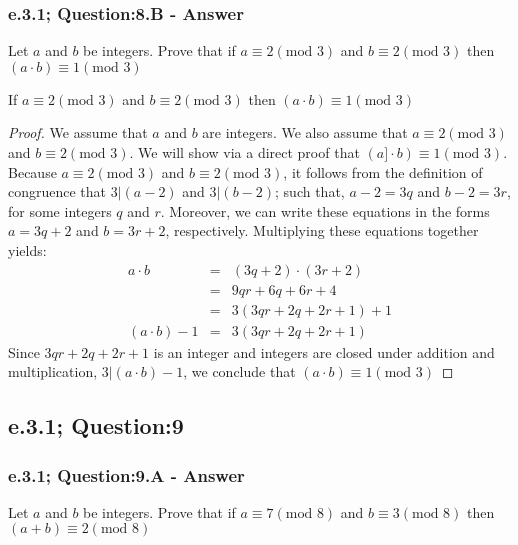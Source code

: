 \newpage
\subsubsection*{e.3.1; Question:8.B - Answer}
Let $a$ and $b$ be integers. Prove that if $a \equiv 2 (\text{mod 3})$ and $b \equiv 2 (\text{mod 3})$ then $(a\cdot b) \equiv 1 (\text{mod 3})$

\begin{tcolorbox}
	\begin{theorem}
		If $a \equiv 2 (\text{mod 3})$ and $b \equiv 2 (\text{mod 3})$ then $(a \cdot b) \equiv 1 (\text{mod 3})$
	\end{theorem}
\end{tcolorbox}

\begin{proof}
We assume that $a$ and $b$ are integers. We also assume that $a \equiv 2 (\text{mod 3})$ and $b \equiv 2 (\text{mod 3})$. We will show via a direct proof that $(a ]\cdot b) \equiv 1 (\text{mod 3})$. Because $a \equiv 2 (\text{mod 3})$ and $b \equiv 2 (\text{mod 3})$, it follows from the definition of congruence that $3|(a-2)$ and $3|(b-2)$; such that, $a-2 = 3q$ and $b-2 = 3r$, for some integers $q$ and $r$. Moreover, we can write these equations in the forms $a = 3q + 2$ and $b = 3r + 2$, respectively. Multiplying these equations together yields: 
	\begin{eqnarray}
		a \cdot b & = & (3q + 2) \cdot (3r + 2) \nonumber \\
		& = & 9qr + 6q + 6r + 4 \nonumber \\
		& = & 3(3qr + 2q + 2r + 1) + 1 \nonumber \\
		(a \cdot b) - 1 & = & 3(3qr + 2q + 2r + 1) \nonumber
	\end{eqnarray}
Since $3qr + 2q + 2r + 1$ is an integer and integers are closed under addition and multiplication, $3 | (a \cdot b) - 1$, we conclude that $(a \cdot b) \equiv 1 (\text{mod 3})$

\end{proof}






\newpage
\subsection{e.3.1; Question:9}
\subsubsection*{e.3.1; Question:9.A - Answer}
Let $a$ and $b$ be integers. Prove that if $a \equiv 7 (\text{mod 8})$ and $b \equiv 3 (\text{mod 8})$ then $(a + b) \equiv 2 (\text{mod 8})$


